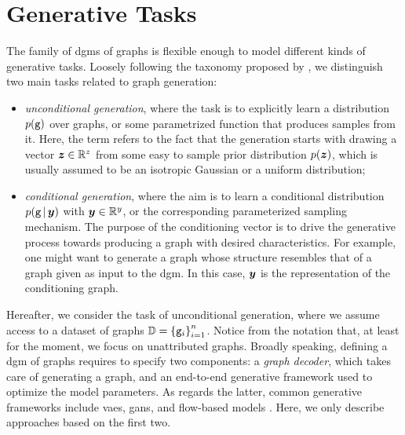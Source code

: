 \section{Generative Tasks}
The family of \glspl{dgm} of graphs is flexible enough to model different kinds of generative tasks. Loosely following the taxonomy proposed by \citet{guo2020systematicreviewgenerativegraphs}, we distinguish two main tasks related to graph generation:
\begin{itemize}
    \item \emph{unconditional generation}, where the task is to explicitly learn a distribution $p(\mathtt{g})$ over graphs, or some parametrized function that produces samples from it. Here, the term  refers to the fact that the generation starts with drawing a vector $\Vector{z} \in \Real^z$ from some easy to sample prior distribution $p(\Vector{z})$, which is usually assumed to be an isotropic Gaussian or a uniform distribution;
    \item \emph{conditional generation}, where the aim is to learn a conditional distribution $p(\Graph{g} \given \Vector{y})$ with $\Vector{y} \in \Real^y$, or the corresponding parameterized sampling mechanism. The purpose of the conditioning vector is to drive the generative process towards producing a graph with desired characteristics. For example, one might want to generate a graph whose structure resembles that of a graph given as input to the \gls{dgm}. In this case, $\Vector{y}$ is the representation of the conditioning graph.
\end{itemize}
Hereafter, we consider the task of unconditional generation, where we assume access to a dataset of graphs $\mathbb{D} = \left\{ \mathtt{g}_i \right\}_{i=1}^n$. Notice from the notation that, at least for the moment, we focus on unattributed graphs. Broadly speaking, defining a \gls{dgm} of graphs requires to specify two components: a \emph{graph decoder}, which takes care of generating a graph, and an end-to-end generative framework used to optimize the model parameters. As regards the latter, common generative frameworks include \glspl{vae}, \glspl{gan}, and flow-based models \citep{rezende2015normalizingflows}. Here, we only describe approaches based on the first two.

